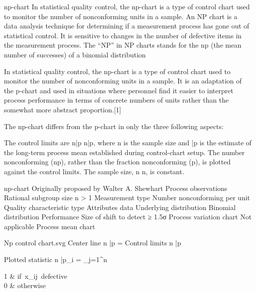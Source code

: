 np-chart
In statistical quality control, the np-chart is a type of control chart used to monitor the number of nonconforming units in a sample. An NP chart is a data analysis technique for determining if a measurement process has gone out of statistical control. It is sensitive to changes in the number of defective items in the measurement process. The “NP” in NP charts stands for the np (the mean number of successes) of a binomial distribution

In statistical quality control, the np-chart is a type of control chart used to monitor the number of nonconforming units in a sample. It is an adaptation of the p-chart and used in situations where personnel find it easier to interpret process performance in terms of concrete numbers of units rather than the somewhat more abstract proportion.[1]

The np-chart differs from the p-chart in only the three following aspects:

The control limits are {\displaystyle n{\bar {p}}} {\displaystyle n{\bar {p}}}, where n is the sample size and {} \bar p is the estimate of the long-term process mean established during control-chart setup.
The number nonconforming (np), rather than the fraction nonconforming (p), is plotted against the control limits.
The sample size, {\displaystyle n} n, is constant.


np-chart
Originally proposed by	Walter A. Shewhart
Process observations
Rational subgroup size	n > 1
Measurement type	Number nonconforming per unit
Quality characteristic type	Attributes data
Underlying distribution	Binomial distribution
Performance
Size of shift to detect	≥ 1.5σ
Process variation chart
Not applicable
Process mean chart

Np control chart.svg
Center line	n \bar p = 
Control limits	n \bar p 

Plotted statistic	n \bar p_i = \sum_{j=1}^n \begin{cases} 1 & \mbox{if }x_{ij}\mbox{ defective} \\ 0 & \mbox{otherwise} \end{cases}



